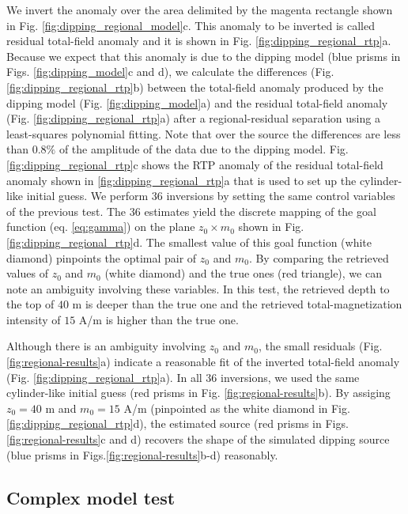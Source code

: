 We invert the anomaly over the area delimited by the magenta rectangle shown in Fig. \ref{fig:dipping_regional_model}c.
This anomaly to be inverted is called residual total-field anomaly and it is shown in 
Fig. \ref{fig:dipping_regional_rtp}a.
Because we expect that this anomaly is due to the dipping model (blue prisms in Figs. \ref{fig:dipping_model}c and d), we calculate the 
differences (Fig. \ref{fig:dipping_regional_rtp}b) between the total-field anomaly produced by the dipping model (Fig. \ref{fig:dipping_model}a) and the residual total-field anomaly 
(Fig. \ref{fig:dipping_regional_rtp}a) after a regional-residual separation using a least-squares polynomial fitting. 
Note that over the source the differences are less than $ 0.8\%$ of the amplitude of the data due to the dipping model.
Fig. \ref{fig:dipping_regional_rtp}c shows the RTP anomaly of the residual total-field anomaly shown in \ref{fig:dipping_regional_rtp}a that is used to set up the 
cylinder-like initial guess.
We perform $ 36 $ inversions by setting the same control variables of the previous test.
The $ 36 $ estimates yield the discrete mapping of the goal function (eq. \ref{eq:gamma}) 
on the plane $z_0 \times m_0 $ shown in Fig. \ref{fig:dipping_regional_rtp}d.
The smallest value of this goal function (white diamond) pinpoints 
the optimal pair of $z_0$ and $m_0$.
By comparing the retrieved values of $z_0$ and $m_0$ (white diamond) and
the true ones (red triangle), we can note an ambiguity involving these variables.
In this test, the retrieved depth to the top of $ 40 $ m is deeper than the true one and the 
retrieved total-magnetization intensity of $ 15 $ A/m is higher than the true one.

Although there is an ambiguity involving $z_0$ and $m_0$, the small residuals (Fig. \ref{fig:regional-results}a) indicate a reasonable fit of the inverted total-field anomaly
(Fig. \ref{fig:dipping_regional_rtp}a).
In all 36 inversions, we used the same cylinder-like initial guess (red prisms in Fig. \ref{fig:regional-results}b).
By assiging $z_0 = 40$ m and $m_0 = 15$ A/m (pinpointed as the white diamond in Fig. \ref{fig:dipping_regional_rtp}d), the estimated source (red prisms in Figs.\ref{fig:regional-results}c and d) recovers the shape of the simulated dipping source 
(blue prisms in Figs.\ref{fig:regional-results}b-d) reasonably.

\subsection{Complex model test}

